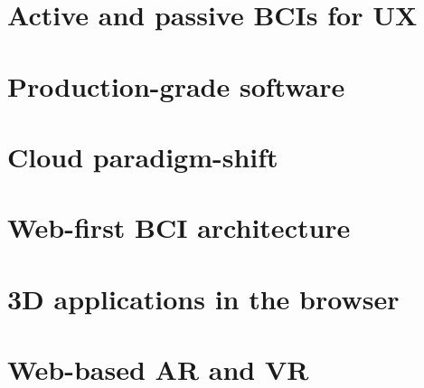 
\section{Active and passive BCIs for UX}
\label{chapter2-active-and-passive-bcis-for-ux}


\section{Production-grade software}
\label{chapter2-production-grade-software}


\section{Cloud paradigm-shift}
\label{chapter2-cloud-paradigm-shift}


\section{Web-first BCI architecture}
\label{chapter2-web-first-bci-architecture}


\section{3D applications in the browser}
\label{chapter2-3d-applications-in-the-browser}


\section{Web-based AR and VR}
\label{chapter2-web-based-ar-and-vr}


